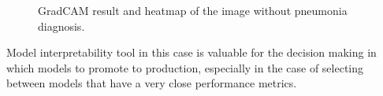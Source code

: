 

\begin{figure}[H]%
    \centering
    \qquad
    \caption{GradCAM result and heatmap of the image without pneumonia diagnosis.}%
    \label{fig:camnormal}%
\end{figure}

Model interpretability tool in this case is valuable for the decision making in which models to promote to production, especially in the case of selecting between models that have a very close performance metrics.

